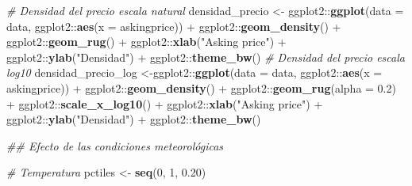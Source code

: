 \documentclass[
  12pt]{article}
\newenvironment{Shaded}{}{}
\newcommand{\CommentTok}[1]{\textcolor[rgb]{0.38,0.63,0.69}{\textit{#1}}}
\newcommand{\DataTypeTok}[1]{\textcolor[rgb]{0.56,0.13,0.00}{#1}}
\newcommand{\DecValTok}[1]{\textcolor[rgb]{0.25,0.63,0.44}{#1}}
\newcommand{\FloatTok}[1]{\textcolor[rgb]{0.25,0.63,0.44}{#1}}
\newcommand{\KeywordTok}[1]{\textcolor[rgb]{0.00,0.44,0.13}{\textbf{#1}}}
\newcommand{\NormalTok}[1]{#1}
\newcommand{\OperatorTok}[1]{\textcolor[rgb]{0.40,0.40,0.40}{#1}}
\newcommand{\StringTok}[1]{\textcolor[rgb]{0.25,0.44,0.63}{#1}}
\begin{document}
\begin{Shaded}
\begin{Highlighting}[]
{{{{{\CommentTok{# Densidad del precio escala natural}
\NormalTok{densidad_precio <-}\StringTok{ }\NormalTok{ggplot2}\OperatorTok{::}\KeywordTok{ggplot}\NormalTok{(}\DataTypeTok{data =}\NormalTok{ data, ggplot2}\OperatorTok{::}\KeywordTok{aes}\NormalTok{(}\DataTypeTok{x =}\NormalTok{ askingprice)) }\OperatorTok{+}
\StringTok{  }\NormalTok{ggplot2}\OperatorTok{::}\KeywordTok{geom_density}\NormalTok{() }\OperatorTok{+}
\StringTok{  }\NormalTok{ggplot2}\OperatorTok{::}\KeywordTok{geom_rug}\NormalTok{() }\OperatorTok{+}
\StringTok{  }\NormalTok{ggplot2}\OperatorTok{::}\KeywordTok{xlab}\NormalTok{(}\StringTok{"Asking price"}\NormalTok{) }\OperatorTok{+}\StringTok{ }\NormalTok{ggplot2}\OperatorTok{::}\KeywordTok{ylab}\NormalTok{(}\StringTok{"Densidad"}\NormalTok{) }\OperatorTok{+}
\StringTok{  }\NormalTok{ggplot2}\OperatorTok{::}\KeywordTok{theme_bw}\NormalTok{()}
\CommentTok{# Densidad del precio escala log10}
\NormalTok{densidad_precio_log <-ggplot2}\OperatorTok{::}\KeywordTok{ggplot}\NormalTok{(}\DataTypeTok{data =}\NormalTok{ data, ggplot2}\OperatorTok{::}\KeywordTok{aes}\NormalTok{(}\DataTypeTok{x =}\NormalTok{ askingprice)) }\OperatorTok{+}
\StringTok{  }\NormalTok{ggplot2}\OperatorTok{::}\KeywordTok{geom_density}\NormalTok{() }\OperatorTok{+}
\StringTok{  }\NormalTok{ggplot2}\OperatorTok{::}\KeywordTok{geom_rug}\NormalTok{(}\DataTypeTok{alpha =} \FloatTok{0.2}\NormalTok{) }\OperatorTok{+}
\StringTok{  }\NormalTok{ggplot2}\OperatorTok{::}\KeywordTok{scale_x_log10}\NormalTok{() }\OperatorTok{+}
\StringTok{  }\NormalTok{ggplot2}\OperatorTok{::}\KeywordTok{xlab}\NormalTok{(}\StringTok{"Asking price"}\NormalTok{) }\OperatorTok{+}\StringTok{ }\NormalTok{ggplot2}\OperatorTok{::}\KeywordTok{ylab}\NormalTok{(}\StringTok{"Densidad"}\NormalTok{) }\OperatorTok{+}
\StringTok{  }\NormalTok{ggplot2}\OperatorTok{::}\KeywordTok{theme_bw}\NormalTok{()}

\CommentTok{## Efecto de las condiciones meteorológicas}

\CommentTok{# Temperatura }
\NormalTok{pctiles <-}\StringTok{ }\KeywordTok{seq}\NormalTok{(}\DecValTok{0}\NormalTok{, }\DecValTok{1}\NormalTok{, }\FloatTok{0.20}\NormalTok{)}

}}}}}
\end{Highlighting}
\end{Shaded}
\end{document}
